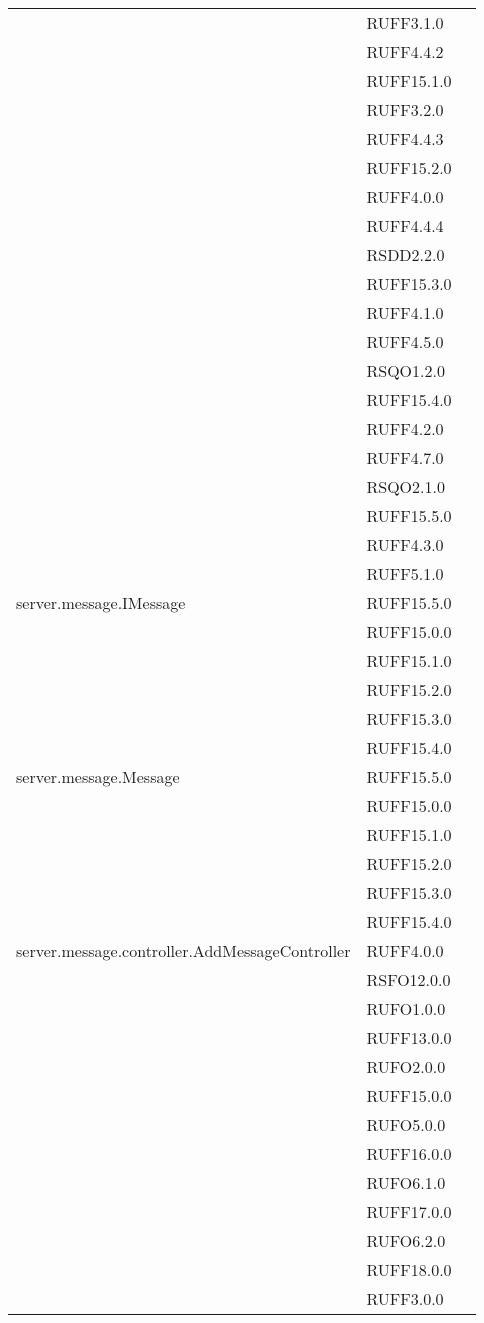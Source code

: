 \begin{center}
\begin{longtable}{lp{}l}
 & RUFF3.1.0 \\
 & RUFF4.4.2 \\
 & RUFF15.1.0 \\
 & RUFF3.2.0 \\
 & RUFF4.4.3 \\
 & RUFF15.2.0 \\
 & RUFF4.0.0 \\
 & RUFF4.4.4 \\
 & RSDD2.2.0 \\
 & RUFF15.3.0 \\
 & RUFF4.1.0 \\
 & RUFF4.5.0 \\
 & RSQO1.2.0 \\
 & RUFF15.4.0 \\
 & RUFF4.2.0 \\
 & RUFF4.7.0 \\
 & RSQO2.1.0 \\
 & RUFF15.5.0 \\
 & RUFF4.3.0 \\
 & RUFF5.1.0 \\
server.message.IMessage & RUFF15.5.0 \\
 & RUFF15.0.0 \\
 & RUFF15.1.0 \\
 & RUFF15.2.0 \\
 & RUFF15.3.0 \\
 & RUFF15.4.0 \\
server.message.Message & RUFF15.5.0 \\
 & RUFF15.0.0 \\
 & RUFF15.1.0 \\
 & RUFF15.2.0 \\
 & RUFF15.3.0 \\
 & RUFF15.4.0 \\
server.message.controller.AddMessageController & RUFF4.0.0 \\
 & RSFO12.0.0 \\
 & RUFO1.0.0 \\
 & RUFF13.0.0 \\
 & RUFO2.0.0 \\
 & RUFF15.0.0 \\
 & RUFO5.0.0 \\
 & RUFF16.0.0 \\
 & RUFO6.1.0 \\
 & RUFF17.0.0 \\
 & RUFO6.2.0 \\
 & RUFF18.0.0 \\
 & RUFF3.0.0 \\

\end{longtable}
\end{center}
